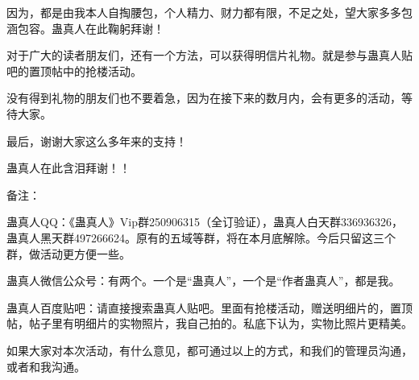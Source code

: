 \begin{this_body}
因为，都是由我本人自掏腰包，个人精力、财力都有限，不足之处，望大家多多包涵包容。蛊真人在此鞠躬拜谢！

对于广大的读者朋友们，还有一个方法，可以获得明信片礼物。就是参与蛊真人贴吧的置顶帖中的抢楼活动。

没有得到礼物的朋友们也不要着急，因为在接下来的数月内，会有更多的活动，等待大家。

最后，谢谢大家这么多年来的支持！

蛊真人在此含泪拜谢！！

备注：

蛊真人QQ：《蛊真人》Vip群250906315（全订验证），蛊真人白天群336936326，蛊真人黑天群497266624。原有的五域等群，将在本月底解除。今后只留这三个群，做活动更方便一些。

蛊真人微信公众号：有两个。一个是“蛊真人”，一个是“作者蛊真人”，都是我。

蛊真人百度贴吧：请直接搜索蛊真人贴吧。里面有抢楼活动，赠送明细片的，置顶帖，帖子里有明细片的实物照片，我自己拍的。私底下认为，实物比照片更精美。

如果大家对本次活动，有什么意见，都可通过以上的方式，和我们的管理员沟通，或者和我沟通。

\end{this_body}

